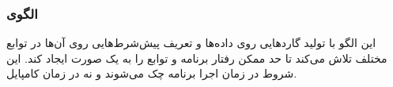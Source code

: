 \subsubsection{الگوی }
\label{safeSmartDataSec}
\begin{RTL}
این الگو با تولید گاردهایی روی داده‌ها و تعریف پیش‌شرط‌هایی روی آن‌ها
در توابع مختلف تلاش می‌کند تا حد ممکن رفتار برنامه و توابع را
به یک صورت  ایجاد کند. این شروط در زمان اجرا برنامه چک
می‌شوند و نه در زمان کامپایل.
\end{RTL}